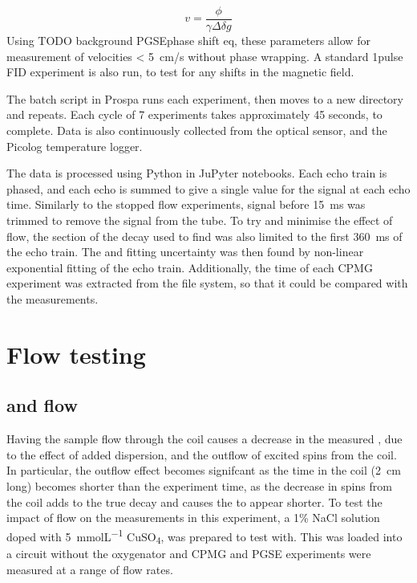 \begin{displaymath}
v = \frac{\phi}{\gamma \Delta \delta g}
\end{displaymath}
Using TODO background PGSEphase shift eq, these parameters allow for measurement of velocities \SI{< 5}{cm/s} without phase wrapping.
A standard 1pulse FID experiment is also run, to test for any shifts in the magnetic field.

The batch script in Prospa runs each experiment, then moves to a new directory and repeats.
Each cycle of 7 experiments takes approximately 45 seconds, to complete.
Data is also continuously collected from the optical \SOtwo sensor, and the Picolog temperature logger.

The data is processed using Python in JuPyter notebooks.
Each echo train is phased, and each echo is summed to give a single value for the signal at each echo time.
Similarly to the stopped flow experiments, signal before \SI{15}{ms} was trimmed to remove the signal from the tube.
To try and minimise the effect of flow, the section of the decay used to find \Ttwo was also limited to the first \SI{360}{ms} of the echo train.
The \Ttwo and fitting uncertainty was then found by non-linear exponential fitting of the echo train.
Additionally, the time of each CPMG experiment was extracted from the file system, so that it could be compared with the \SOtwo measurements.


\section{Flow testing}
\subsection{\Ttwo and flow}
\label{sec:contflow-Ttwoflow}
Having the sample flow through the coil causes a decrease in the measured \Ttwo, due to the effect of added dispersion, and the outflow of excited spins from the coil.
In particular, the outflow effect becomes signifcant as the time in the coil (\SI{2}{cm} long) becomes shorter than the experiment time, as the decrease in spins from the coil adds to the true \Ttwo decay and causes the \Ttwo to appear shorter.
To test the impact of flow on the \Ttwo measurements in this experiment, a 1\% NaCl solution doped with \SI{5}{mmolL^{-1}} CuSO\textsubscript{4}, was prepared to test with.
This was loaded into a circuit without the oxygenator and CPMG and PGSE experiments were measured at a range of flow rates.

